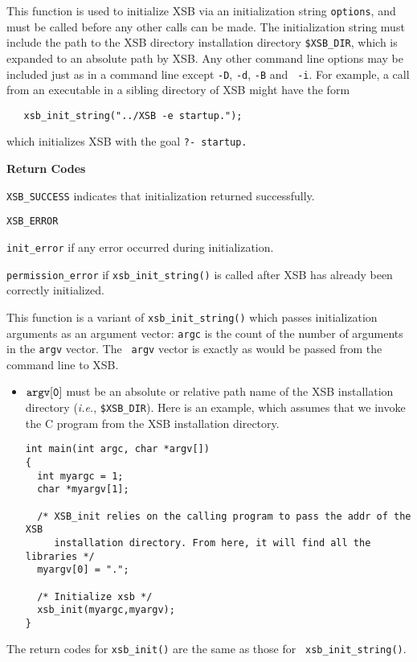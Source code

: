 \begin{description}

%
This function is used to initialize XSB via an initialization string
{\tt *options}, and must be called before any other calls can be made.
The initialization string must include the path to the XSB directory
installation directory {\tt \$XSB\_DIR}, which is expanded to an
absolute path by XSB.  Any other command line options may be included
just as in a command line except {\tt -D}, {\tt -d}, {\tt -B} and {\tt
  -i}.  For example, a call from an executable in a sibling directory
of XSB might have the form
\begin{verbatim}
   xsb_init_string("../XSB -e startup.");
\end{verbatim}
which initializes XSB with the goal {\tt ?- startup.}

{\bf Return Codes}  
\bi
\item {\tt XSB\_SUCCESS} indicates that initialization returned
  successfully.
%
\item {\tt XSB\_ERROR} 
\bi
\item {\tt init\_error} if any error occurred during initialization. 

\item {\tt permission\_error} if {\tt xsb\_init\_string()} is called
  after XSB has already been correctly initialized.  
\ei
%
\ei

%
This function is a variant of {\tt xsb\_init\_string()} which passes
initialization arguments as an argument vector: {\tt argc} is the
count of the number of arguments in the {\tt argv} vector.  The {\tt
  argv} vector is exactly as would be passed from the command line to
XSB.
\begin{itemize}
\item $\tt argv[0]$ must be an absolute or relative path name of the XSB
  installation directory ({\it i.e.}, {\tt \$XSB\_DIR}).  Here is an
  example, which assumes that we invoke the C program from the XSB
  installation directory.
    \begin{verbatim}
int main(int argc, char *argv[])
{ 
  int myargc = 1;
  char *myargv[1];

  /* XSB_init relies on the calling program to pass the addr of the XSB
     installation directory. From here, it will find all the libraries */
  myargv[0] = ".";

  /* Initialize xsb */
  xsb_init(myargc,myargv);
}
    \end{verbatim}
\end{itemize}
The return codes for {\tt xsb\_init()} are the same as those for {\tt
  xsb\_init\_string()}.


\end{description}
